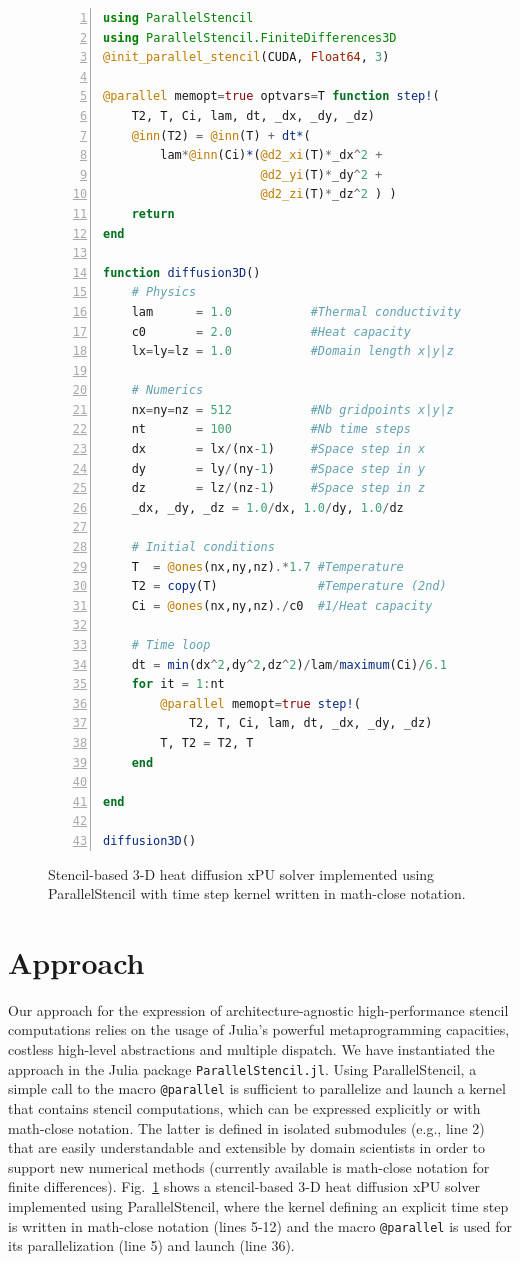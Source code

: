 \documentclass{juliacon}
\begin{document}
\begin{figure}[t]
\begin{lstlisting}[language = Julia, numbers=left, numberstyle=\tiny\color{gray}]
using ParallelStencil
using ParallelStencil.FiniteDifferences3D
@init_parallel_stencil(CUDA, Float64, 3)

@parallel memopt=true optvars=T function step!(
    T2, T, Ci, lam, dt, _dx, _dy, _dz)
    @inn(T2) = @inn(T) + dt*(
        lam*@inn(Ci)*(@d2_xi(T)*_dx^2 +
                      @d2_yi(T)*_dy^2 +
                      @d2_zi(T)*_dz^2 ) )
    return
end

function diffusion3D()
    # Physics
    lam      = 1.0           #Thermal conductivity
    c0       = 2.0           #Heat capacity
    lx=ly=lz = 1.0           #Domain length x|y|z

    # Numerics
    nx=ny=nz = 512           #Nb gridpoints x|y|z
    nt       = 100           #Nb time steps
    dx       = lx/(nx-1)     #Space step in x
    dy       = ly/(ny-1)     #Space step in y
    dz       = lz/(nz-1)     #Space step in z
    _dx, _dy, _dz = 1.0/dx, 1.0/dy, 1.0/dz

    # Initial conditions
    T  = @ones(nx,ny,nz).*1.7 #Temperature
    T2 = copy(T)              #Temperature (2nd)
    Ci = @ones(nx,ny,nz)./c0  #1/Heat capacity

    # Time loop
    dt = min(dx^2,dy^2,dz^2)/lam/maximum(Ci)/6.1
    for it = 1:nt
        @parallel memopt=true step!(
            T2, T, Ci, lam, dt, _dx, _dy, _dz)
        T, T2 = T2, T
    end

end

diffusion3D()

\end{lstlisting}

\caption{Stencil-based 3-D heat diffusion xPU solver implemented using ParallelStencil with time step kernel written in math-close notation.}
	\label{fig:code}
\end{figure}

\section{Approach}
Our approach for the expression of architecture-agnostic high-performance stencil computations relies on the usage of Julia's powerful metaprogramming capacities, costless high-level abstractions and multiple dispatch. We have instantiated the approach in the Julia package \texttt{ParallelStencil.jl}. Using ParallelStencil, a simple call to the macro \texttt{@parallel} is sufficient to parallelize and launch a kernel that contains stencil computations, which can be expressed explicitly or with math-close notation. The latter is defined in isolated submodules (e.g., line 2) that are easily understandable and extensible by domain scientists in order to support new numerical methods (currently available is math-close notation for finite differences). Fig.~\ref{fig:code} shows a stencil-based 3-D heat diffusion xPU solver implemented using ParallelStencil, where the kernel defining an explicit time step is written in math-close notation (lines 5-12) and the macro \texttt{@parallel} is used for its parallelization (line 5) and launch (line 36).
\end{document}
